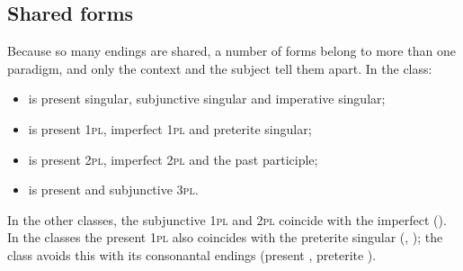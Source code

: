 \subsection{Shared forms}
Because so many endings are shared, a number of forms belong to more than one paradigm, and only the context and the subject tell them apart. In the  class:
\begin{itemize}
    \item {} is present singular, subjunctive singular and imperative singular;
    \item {} is present 1\textsc{pl}, imperfect 1\textsc{pl} and preterite singular;
    \item {} is present 2\textsc{pl}, imperfect 2\textsc{pl} and the past participle;
    \item {} is present and subjunctive 3\textsc{pl}.
\end{itemize}
In the other classes, the subjunctive 1\textsc{pl} and 2\textsc{pl} coincide with the imperfect (). In the  classes the present 1\textsc{pl} also coincides with the preterite singular (, ); the  class avoids this with its consonantal endings (present , preterite ).

